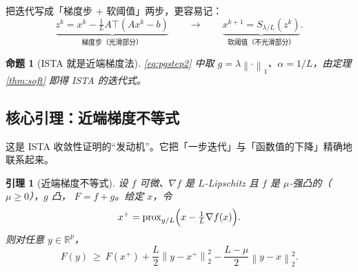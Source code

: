 \documentclass[11pt,a4paper,UTF8]{ctexart}
\theoremstyle{plain}
\newtheorem{lemma}[theorem]{引理}
\newtheorem{proposition}[theorem]{命题}
\theoremstyle{definition}
\theoremstyle{remark}
\newcommand{\R}{\mathbb{R}}
\newcommand{\norm}[1]{\left\lVert #1 \right\rVert}
\newcommand{\prox}{\operatorname{prox}}
\begin{document}
把迭代写成「梯度步 + 软阈值」两步，更容易记：
\[
\underbrace{z^k=x^k-\tfrac1L A\top(Ax^k-b)}_{\text{梯度步（光滑部分）}}
\qquad\longrightarrow\qquad
\underbrace{x^{k+1}=S_{\lambda/L}(z^k)}_{\text{软阈值（不光滑部分）}}.
\]

\begin{proposition}[ISTA 就是近端梯度法]
\eqref{eq:pgstep2} 中取 $g=\lambda\norm\cdot_1$、$\alpha=1/L$，由定理 \ref{thm:soft} 即得 ISTA 的迭代式。
\end{proposition}

\subsection{核心引理：近端梯度不等式}

这是 ISTA 收敛性证明的``发动机''。它把「一步迭代」与「函数值的下降」精确地联系起来。

\begin{lemma}[近端梯度不等式]\label{lem:pgineq}
设 $f$ 可微、$\nabla f$ 是 $L$-Lipschitz 且 $f$ 是 $\mu$-强凸的（$\mu\ge0$），$g$ 凸，
$F=f+g$。给定 $x$，令
\[
x^+=\prox_{g/L}\Bigl(x-\tfrac1L\nabla f(x)\Bigr).
\]
则对任意 $y\in\R^p$，
\begin{equation}
F(y)\ \ge\ F(x^+)+\frac L2\norm{y-x^+}_2^2-\frac{L-\mu}{2}\norm{y-x}_2^2 .
\label{eq:pgineq}
\end{equation}
\end{lemma}
\end{document}
